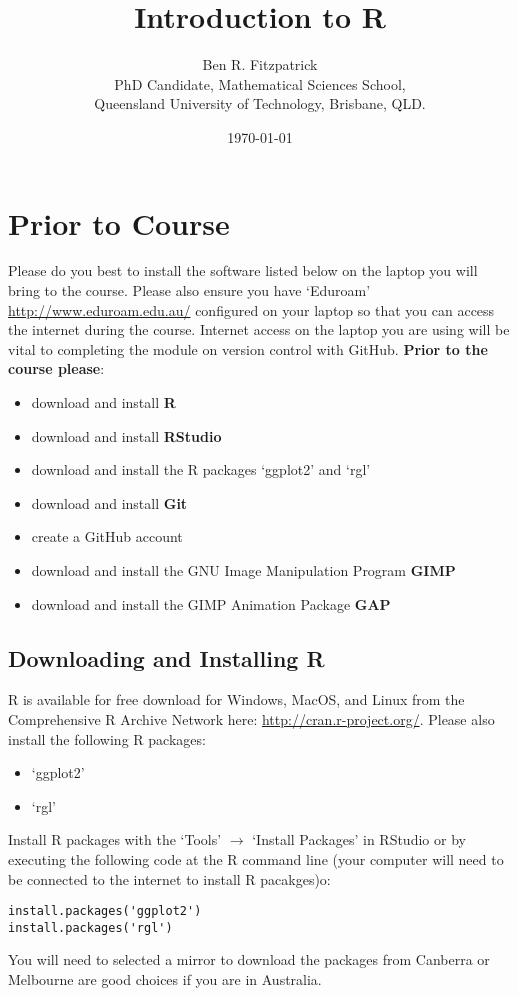 \documentclass{article}[12pt]
\begin{document}
\title{Introduction to R}
\author{Ben R. Fitzpatrick\\ 
\small PhD Candidate, Mathematical Sciences School,\\
\small Queensland University of Technology, Brisbane, QLD.}
\date{\today}
\maketitle

\section*{Prior to Course}
Please do you best to install the software listed below on the laptop you will bring to the course.
Please also ensure you have `Eduroam' \url{http://www.eduroam.edu.au/} configured on your laptop so that you can access the internet during the course.  
Internet access on the laptop you are using will be vital to completing the module on version control with GitHub.
\newline
\newline
\textbf{Prior to the course please}: \begin{itemize}
\item download and install \textbf{R}
\item download and install \textbf{RStudio}
\item download and install the R packages `ggplot2' and `rgl'
\item download and install \textbf{Git}
\item create a GitHub account 
\item download and install the GNU Image Manipulation Program \textbf{GIMP}
\item download and install the GIMP Animation Package \textbf{GAP}
\end{itemize}

\subsection*{Downloading and Installing R}
R is available for free download for Windows, MacOS, and Linux from the Comprehensive R Archive Network here: \url{http://cran.r-project.org/}.
\newline
\newline
Please also install the following R packages:  \begin{itemize}
 \item `ggplot2'
 \item `rgl' \end{itemize}
Install R packages with the `Tools' $\rightarrow$ `Install Packages' in RStudio or by executing the following code at the R command line (your computer will need to be connected to the internet to install R pacakges)o:
\begin{verbatim}
install.packages('ggplot2')
install.packages('rgl')
\end{verbatim}
You will need to selected a mirror to download the packages from Canberra or Melbourne are good choices if you are in Australia.
\end{document}
